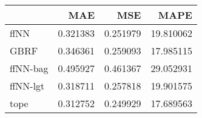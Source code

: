 \begin{tabular}{lrrr}
\toprule
{} &       MAE &       MSE &       MAPE \\
\midrule
ffNN     &  0.321383 &  0.251979 &  19.810062 \\
GBRF     &  0.346361 &  0.259093 &  17.985115 \\
ffNN-bag &  0.495927 &  0.461367 &  29.052931 \\
ffNN-lgt &  0.318711 &  0.257818 &  19.901575 \\
tope     &  0.312752 &  0.249929 &  17.689563 \\
\bottomrule
\end{tabular}
